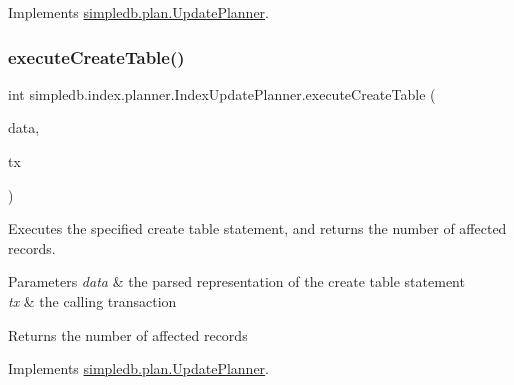 Implements \hyperlink{interfacesimpledb_1_1plan_1_1UpdatePlanner_a62e66672add275bc79b05825186051aa}{simpledb.\+plan.\+Update\+Planner}.

\mbox{\label{classsimpledb_1_1index_1_1planner_1_1IndexUpdatePlanner_a530ca9f0043be30f228ccaf7d99ce0bb}} 
\subsubsection{\texorpdfstring{execute\+Create\+Table()}{executeCreateTable()}}
{\footnotesize\ttfamily int simpledb.\+index.\+planner.\+Index\+Update\+Planner.\+execute\+Create\+Table (\begin{DoxyParamCaption}\item[{\hyperlink{classsimpledb_1_1parse_1_1CreateTableData}{Create\+Table\+Data}}]{data,  }\item[{\hyperlink{classsimpledb_1_1tx_1_1Transaction}{Transaction}}]{tx }\end{DoxyParamCaption})\hspace{0.3cm}{\ttfamily [inline]}}

Executes the specified create table statement, and returns the number of affected records. 
\begin{DoxyParams}{Parameters}
{\em data} & the parsed representation of the create table statement \\
\hline
{\em tx} & the calling transaction \\
\hline
\end{DoxyParams}
\begin{DoxyReturn}{Returns}
the number of affected records 
\end{DoxyReturn}


Implements \hyperlink{interfacesimpledb_1_1plan_1_1UpdatePlanner_a44085c8b895a3da12486d3f59fde4a3a}{simpledb.\+plan.\+Update\+Planner}.

\mbox{\label{classsimpledb_1_1index_1_1planner_1_1IndexUpdatePlanner_aa1ce4cdb68a43048a7809b08a28149f0}} 
